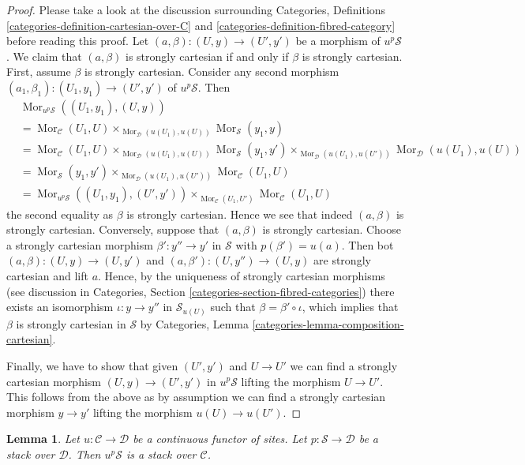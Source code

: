 \documentclass{stacks-project}
\theoremstyle{plain}
\newtheorem{lemma}[subsection]{Lemma}
\theoremstyle{definition}
\theoremstyle{remark}
\numberwithin{equation}{subsection}
\def\Mor{\mathop{\mathrm{Mor}}\nolimits}
\begin{document}
\begin{proof}
Please take a look at the discussion surrounding
Categories, Definitions \ref{categories-definition-cartesian-over-C} and
\ref{categories-definition-fibred-category}
before reading this proof.
Let $(a, \beta) : (U, y) \to (U', y')$ be a morphism of $u^p\mathcal{S}$.
We claim that $(a, \beta)$ is strongly cartesian if and only if
$\beta$ is strongly cartesian. First, assume $\beta$ is strongly cartesian.
Consider any second morphism
$(a_1, \beta_1) : (U_1, y_1) \to (U', y')$ of $u^p\mathcal{S}$.
Then
\begin{align*}
& \Mor_{u^p\mathcal{S}}((U_1, y_1), (U, y)) \\
& =
\Mor_\mathcal{C}(U_1, U)
\times_{\Mor_\mathcal{D}(u(U_1), u(U))}
\Mor_\mathcal{S}(y_1, y) \\
& =
\Mor_\mathcal{C}(U_1, U)
\times_{\Mor_\mathcal{D}(u(U_1), u(U))}
\Mor_\mathcal{S}(y_1, y')
\times_{\Mor_\mathcal{D}(u(U_1), u(U'))}
\Mor_\mathcal{D}(u(U_1), u(U)) \\
& =
\Mor_\mathcal{S}(y_1, y')
\times_{\Mor_\mathcal{D}(u(U_1), u(U'))}
\Mor_\mathcal{C}(U_1, U) \\
& =
\Mor_{u^p\mathcal{S}}((U_1, y_1), (U', y'))
\times_{\Mor_\mathcal{C}(U_1, U')}
\Mor_\mathcal{C}(U_1, U)
\end{align*}
the second equality as $\beta$ is strongly cartesian. Hence we see that
indeed $(a, \beta)$ is strongly cartesian. Conversely, suppose that
$(a, \beta)$ is strongly cartesian. Choose a strongly cartesian morphism
$\beta' : y'' \to y'$ in $\mathcal{S}$ with $p(\beta') = u(a)$.
Then bot $(a, \beta) : (U, y) \to (U, y')$ and
$(a, \beta') : (U, y'') \to (U, y)$ are strongly cartesian and
lift $a$. Hence, by the uniqueness of strongly cartesian morphisms
(see discussion in
Categories, Section \ref{categories-section-fibred-categories})
there exists an isomorphism $\iota : y \to y''$ in $\mathcal{S}_{u(U)}$
such that $\beta = \beta' \circ \iota$, which implies that
$\beta$ is strongly cartesian in $\mathcal{S}$ by
Categories, Lemma \ref{categories-lemma-composition-cartesian}.

\medskip\noindent
Finally, we have to show
that given $(U', y')$ and $U \to U'$ we can find a strongly
cartesian morphism $(U, y) \to (U', y')$ in $u^p\mathcal{S}$
lifting the morphism $U \to U'$. This follows from the above as by assumption
we can find a strongly cartesian morphism $y \to y'$ lifting the
morphism $u(U) \to u(U')$.
\end{proof}

\begin{lemma}
\label{lemma-stack-pushforward}
Let $u : \mathcal{C} \to \mathcal{D}$ be a continuous functor of sites.
Let $p : \mathcal{S} \to \mathcal{D}$ be a stack over $\mathcal{D}$.
Then $u^p\mathcal{S}$ is a stack over $\mathcal{C}$.
\end{lemma}
\end{document}
